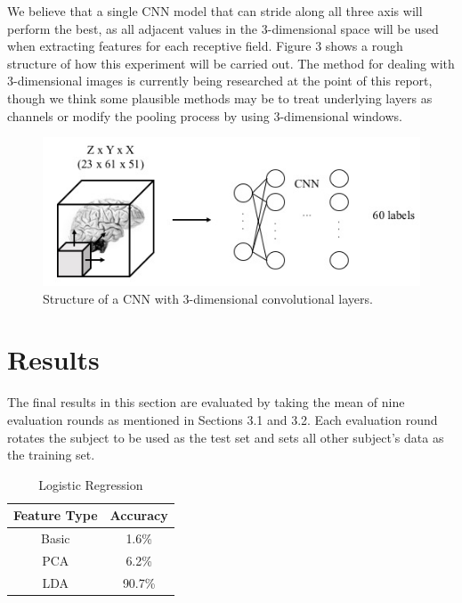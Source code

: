 \documentclass{article} %
\begin{document}
We believe that a single CNN model that can stride along all three axis will perform the best, as all adjacent values in the 3-dimensional space will be used when extracting features for each receptive field. Figure 3 shows a rough structure of how this experiment will be carried out. The method for dealing with 3-dimensional images is currently being researched at the point of this report, though we think some plausible methods may be to treat underlying layers as channels or modify the pooling process by using 3-dimensional windows.

\begin{figure}[h]
	\centering
	\includegraphics[height=0.2\textheight]{./img/cnn_proto_c.png}
	\caption{Structure of a CNN with 3-dimensional convolutional layers.}
\end{figure}

\section{Results}

The final results in this section are evaluated by taking the mean of nine evaluation rounds as mentioned in Sections 3.1 and 3.2. Each evaluation round rotates the subject to be used as the test set and sets all other subject's data as the training set.

\begin{table}[H]
\centering
\caption{Logistic Regression}

\begin{tabular}{|c|c|}
\hline
\textbf{Feature Type} & \textbf{Accuracy} \\ \hline
Basic                 &          1.6\%         \\ \hline
PCA                   &           6.2\%        \\ \hline
LDA                   &            90.7\%       \\ \hline
\end{tabular}
\end{table}
\end{document}
